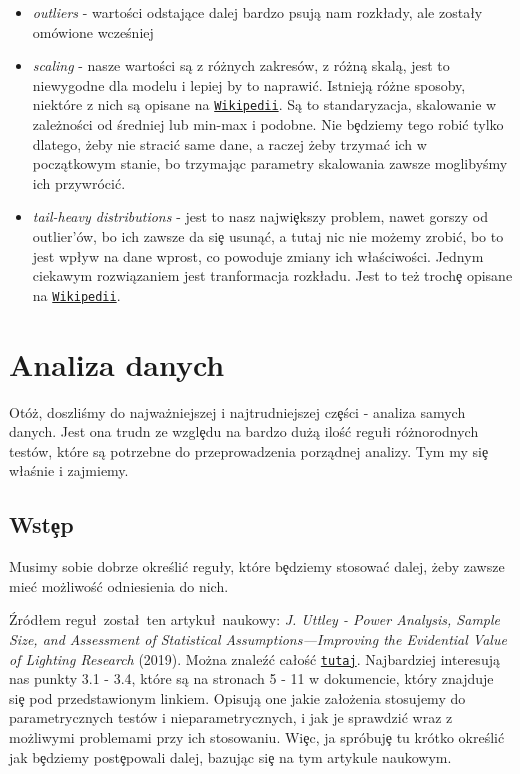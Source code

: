 \documentclass{article}
\begin{document}
\begin{itemize}
  \item \textit{outliers} - wartości odstające dalej bardzo psują nam rozk\l ady, ale zosta\l y omówione wcześniej
  \item \textit{scaling} - nasze wartości są z różnych zakresów, z różną skalą, jest to niewygodne dla modelu i lepiej by to naprawi\'c. Istnieją różne sposoby, niektóre z nich są opisane na \href{https://en.wikipedia.org/wiki/Feature_scaling}{\texttt{Wikipedii}}. Są to standaryzacja, skalowanie w zależności od średniej lub min-max i podobne. Nie b\c edziemy tego robi\'c tylko dlatego, żeby nie straci\'c same dane, a raczej żeby trzyma\'c ich w początkowym stanie, bo trzymając parametry skalowania zawsze moglibyśmy ich przywróci\'c.
  \item \textit{tail-heavy distributions} - jest to nasz najwi\c ekszy problem, nawet gorszy od outlier'ów, bo ich zawsze da si\c e usuną\'c, a tutaj nic nie możemy zrobi\'c, bo to jest wp\l yw na dane wprost, co powoduje zmiany ich w\l aściwości. Jednym ciekawym rozwiązaniem jest tranformacja rozk\l adu. Jest to też troch\c e opisane na \href{https://en.wikipedia.org/wiki/Data_transformation_(statistics)}{\texttt{Wikipedii}}.
\end{itemize}

\section{Analiza danych}
\quad Otóż, doszliśmy do najważniejszej i najtrudniejszej cz\c eści - analiza samych danych. Jest ona trudn ze wzgl\c edu na bardzo dużą iloś\'c regu\l i różnorodnych testów, które są potrzebne do przeprowadzenia porządnej analizy. Tym my si\c e w\l aśnie i zajmiemy.

\subsection{Wst\c ep}
\quad Musimy sobie dobrze określi\'c regu\l y, które b\c edziemy stosowa\'c dalej, żeby zawsze mie\'c możliwoś\'c odniesienia do nich.

\noindent
\quad Źród\l em regu\l\ zosta\l\ ten artyku\l\ naukowy: \textit{J. Uttley - Power Analysis, Sample Size, and Assessment of Statistical Assumptions—Improving the Evidential Value of Lighting Research} (2019). Można znaleź\'c ca\l oś\'c \href{https://www.tandfonline.com/doi/pdf/10.1080/15502724.2018.1533851}{\texttt{tutaj}}. Najbardziej interesują nas punkty 3.1 - 3.4, które są na stronach 5 - 11 w dokumencie, który znajduje si\c e pod przedstawionym linkiem. Opisują one jakie za\l ożenia stosujemy do parametrycznych testów i nieparametrycznych, i jak je sprawdzi\'c wraz z możliwymi problemami przy ich stosowaniu. Wi\c ec, ja spróbuj\c e tu krótko określi\'c jak b\c edziemy post\c epowali dalej, bazując si\c e na tym artykule naukowym.
\end{document}
